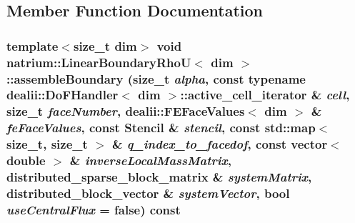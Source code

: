\subsection{Member Function Documentation}
\hypertarget{classnatrium_1_1LinearBoundaryRhoU_a9fecb00df16c4294d9852222ddbdb4ca}{
\subsubsection[{assembleBoundary}]{\setlength{\rightskip}{0pt plus 5cm}template$<$size\_\-t dim$>$ void {\bf natrium::LinearBoundaryRhoU}$<$ dim $>$::assembleBoundary (size\_\-t {\em alpha}, \/  const typename dealii::DoFHandler$<$ dim $>$::active\_\-cell\_\-iterator \& {\em cell}, \/  size\_\-t {\em faceNumber}, \/  dealii::FEFaceValues$<$ dim $>$ \& {\em feFaceValues}, \/  const {\bf Stencil} \& {\em stencil}, \/  const std::map$<$ size\_\-t, size\_\-t $>$ \& {\em q\_\-index\_\-to\_\-facedof}, \/  const vector$<$ double $>$ \& {\em inverseLocalMassMatrix}, \/  distributed\_\-sparse\_\-block\_\-matrix \& {\em systemMatrix}, \/  distributed\_\-block\_\-vector \& {\em systemVector}, \/  bool {\em useCentralFlux} = {\ttfamily false}) const}}
\label{classnatrium_1_1LinearBoundaryRhoU_a9fecb00df16c4294d9852222ddbdb4ca}


